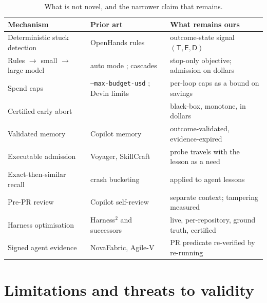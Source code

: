 \documentclass[11pt]{article}
\theoremstyle{remark}
\newcommand{\Tset}{\mathsf{T}}
\newcommand{\Eerr}{\mathsf{E}}
\newcommand{\Dtree}{\mathsf{D}}
\begin{document}
\begin{table}[t]
\centering\small
\begin{tabularx}{\linewidth}{@{}lXX@{}}
\toprule
Mechanism & Prior art & What remains ours \\
\midrule
Deterministic stuck detection & OpenHands rules \citep{openhands2026stuck} & outcome-state signal $(\Tset,\Eerr,\Dtree)$ \\
Rules $\to$ small $\to$ large model & auto mode \citep{anthropic2026automode}; cascades \citep{chen2023frugalgpt} & stop-only objective; admission on dollars \\
Spend caps & \texttt{--max-budget-usd} \citep{claudecode2026cli}; Devin limits \citep{devin2026docs} & per-loop caps as a bound on savings \\
Certified early abort & \citet{ruan2026doomed} & black-box, monotone, in dollars \\
Validated memory & Copilot memory \citep{github2026memory} & outcome-validated, evidence-expired \\
Executable admission & Voyager, SkillCraft \citep{wang2023voyager,skillcraft2026} & probe travels with the lesson as a need \\
Exact-then-similar recall & crash bucketing \citep{glerum2009wer} & applied to agent lessons \\
Pre-PR review & Copilot self-review \citep{github2025selfreview} & separate context; tampering measured \\
Harness optimisation & Harness$^2$ and successors & live, per-repository, ground truth, certified \\
Signed agent evidence & NovaFabric, Agile-V & PR predicate re-verified by re-running \\
\bottomrule
\end{tabularx}
\caption{What is not novel, and the narrower claim that remains.}
\label{tab:notnovel}
\end{table}

\section{Limitations and threats to validity}
\label{sec:limits}
\end{document}
